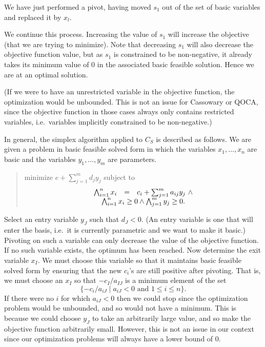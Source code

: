\documentclass{article}
\begin{document}
We have just performed a pivot, having moved $s_1$ out of the set of basic
variables and replaced it by $x_l$.

We continue this process.  Increasing the value of $s_1$ will increase
the objective (that we are trying to minimize).  Note that decreasing $s_1$ will also decrease the
objective function value, but as $s_1$ is constrained to be non-negative,
it already takes its minimum value of $0$ in the associated basic feasible
solution.  Hence we are at an optimal solution.  

(If we were to have an unrestricted variable in the objective function, the
optimization would be unbounded.  This is not an issue for Cassowary or
QOCA, since the objective function in those cases always only contains
restricted variables, i.e.\ variables implicitly constrained to be
non-negative.)

In general, the simplex algorithm applied to $C_S$ 
is described as follows. 
We are given a problem in basic feasible solved form in which 
the variables $x_1, \ldots ,x_n$ are basic and the variables
$y_1, \ldots ,y_m$ are parameters.
\begin{quote}\vspace*{-1ex}
minimize $e + \sum_{j=1}^{m} d_j y_j$
subject to 
$$
\begin{array}{rcr}
        \bigwedge_{i=1}^{n} x_i & = & c_i + \sum_{j=1}^{m} a_{ij} y_j ~\wedge\\
                  \multicolumn{3}{c}{\bigwedge_{i=1}^{n} x_i \ge 0 \wedge
                  \bigwedge_{j=1}^{m} y_j \ge 0. }
            \end{array}
$$
\end{quote}\vspace{-0.9ex}
Select an entry variable $y_J$ such that $d_J < 0$.  (An entry variable is
one that will enter the basis, i.e.\ it is currently parametric and we want
to make it basic.)
Pivoting on such a variable can only decrease the value of the objective
function.
If no such variable exists, the optimum has been reached.
Now determine the exit variable $x_I$\@.  We must choose this variable so that
it maintains  basic feasible solved form by ensuring 
that the new $c_i$'s are still positive after pivoting. 
That is, we must choose an $x_I$ 
so that $- c_I/ a_{IJ}$ is a minimum element
of the set
$$
\{ -c_i/a_{iJ} \mid a_{iJ} < 0 \mbox{ and } 1 \le i \le n \}.
$$
If there were no $i$ for which $a_{iJ} < 0$ then we could stop since the
optimization problem would be unbounded, and so would not have
a minimum.  This is because we could choose $y_J$ to take an arbitrarily
large value, and so make the objective function arbitrarily small.
However, this is not an issue in our context since our
optimization problems will always have a lower bound of 0.
\end{document}
